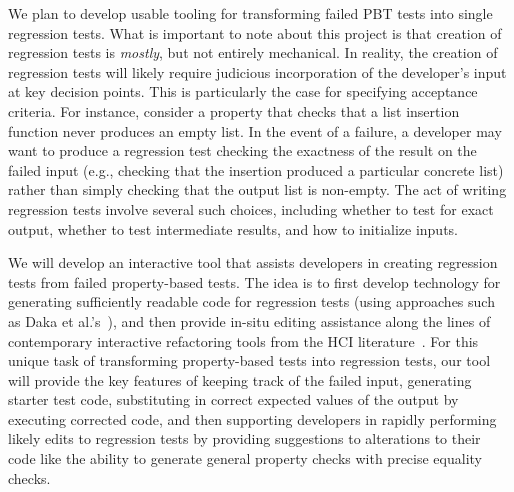 We plan to develop usable tooling for transforming failed PBT tests into single
regression tests. What is important to note about this project is that creation
of regression tests is \emph{mostly}, but not entirely mechanical. In reality,
the creation of regression tests will likely require judicious incorporation of
the developer's input at key decision points. This is particularly the case for
specifying acceptance criteria. For instance, consider a property that checks
that a list insertion function never produces an empty list. In the event of a
failure, a developer may want to produce a regression test checking the
exactness of the result on the failed input (e.g., checking that the insertion
produced a particular concrete list) rather than simply checking that the output
list is non-empty. The act of writing regression tests involve several such
choices, including whether to test for exact output, whether to test
intermediate results, and how to initialize inputs.

We will develop an interactive tool that assists developers in creating
regression tests from failed property-based tests. The idea is to first develop
technology for generating sufficiently readable code for regression tests (using
approaches such as Daka et al.'s~\cite{ref:daka2015modeling}), and then provide
in-situ editing assistance along the lines of contemporary interactive
refactoring tools from the HCI
literature~\cite{ref:head2018interactive,ref:barik2016quick,ref:murphyhill2008refactoring,ref:lee2013draganddrop}.
For this unique task of transforming property-based tests into regression tests,
our tool will provide the key features of keeping track of the failed input,
generating starter test code, substituting in correct expected values of the
output by executing corrected code, and then supporting developers in rapidly
performing likely edits to regression tests by providing suggestions to
alterations to their code like the ability to generate general property checks
with precise equality checks.



